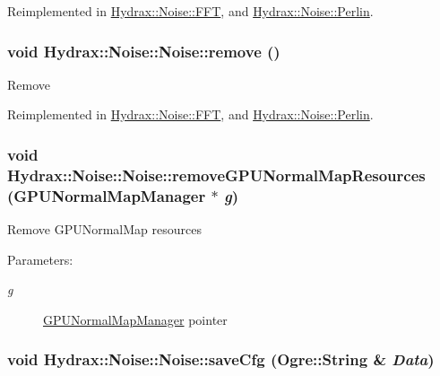Reimplemented in \hyperlink{class_hydrax_1_1_noise_1_1_f_f_t_64245b9e56eeb8627ac3f5260dc203dd}{Hydrax::Noise::FFT}, and \hyperlink{class_hydrax_1_1_noise_1_1_perlin_3a2dab14cfbda1ccf8fc5de4bb89f124}{Hydrax::Noise::Perlin}.\hypertarget{class_hydrax_1_1_noise_1_1_noise_00c4aaa7604ea492740318d01f651606}{
\subsubsection[{remove}]{\setlength{\rightskip}{0pt plus 5cm}void Hydrax::Noise::Noise::remove ()}}
\label{class_hydrax_1_1_noise_1_1_noise_00c4aaa7604ea492740318d01f651606}


Remove 

Reimplemented in \hyperlink{class_hydrax_1_1_noise_1_1_f_f_t_9567d90d8fae8dbd74d05d1e3b8281e4}{Hydrax::Noise::FFT}, and \hyperlink{class_hydrax_1_1_noise_1_1_perlin_666010a5142bbb2b03c97aa5aa7bdef1}{Hydrax::Noise::Perlin}.\hypertarget{class_hydrax_1_1_noise_1_1_noise_9d3ca345d3f5b629e43ab276236d93b7}{
\subsubsection[{removeGPUNormalMapResources}]{\setlength{\rightskip}{0pt plus 5cm}void Hydrax::Noise::Noise::removeGPUNormalMapResources ({\bf GPUNormalMapManager} $\ast$ {\em g})}}
\label{class_hydrax_1_1_noise_1_1_noise_9d3ca345d3f5b629e43ab276236d93b7}


Remove GPUNormalMap resources \begin{Desc}
\item[Parameters:]
\begin{description}
\item[{\em g}]\hyperlink{class_hydrax_1_1_g_p_u_normal_map_manager}{GPUNormalMapManager} pointer \end{description}
\end{Desc}
\hypertarget{class_hydrax_1_1_noise_1_1_noise_ac0a9fe1533ddd87467edb954f8abea8}{
\subsubsection[{saveCfg}]{\setlength{\rightskip}{0pt plus 5cm}void Hydrax::Noise::Noise::saveCfg (Ogre::String \& {\em Data})}}
\label{class_hydrax_1_1_noise_1_1_noise_ac0a9fe1533ddd87467edb954f8abea8}


